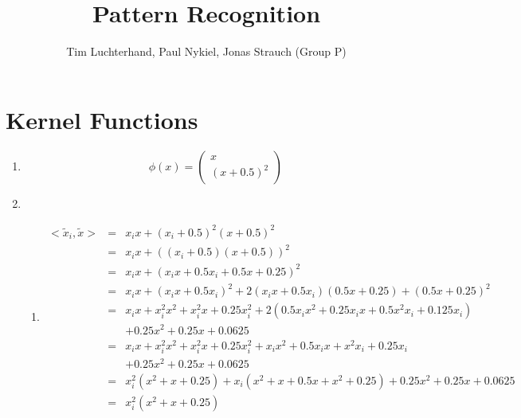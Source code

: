 \documentclass[DIN, pagenumber=false, fontsize=11pt, parskip=half]{scrartcl}
\title{Pattern Recognition}
\author{Tim Luchterhand, Paul Nykiel, Jonas Strauch (Group P)}
\begin{document}
    \maketitle
    \section{Kernel Functions}
    \begin{enumerate}
        \item 
            \begin{equation*}
                \phi(x) = \begin{pmatrix} x \\ {(x + 0.5)}^2 \end{pmatrix}
            \end{equation*}
            \setcounter{enumi}{3}
        \item
            \begin{enumerate}[label=\alph*)]
                \item
                    \begin{eqnarray*}
                        <\tilde{x}_i, \tilde{x}>
                            &=& x_i x + {(x_i + 0.5)}^2 {(x + 0.5)}^2 \\
                            &=& x_i x + {\left((x_i + 0.5) (x + 0.5)\right)}^2 \\
                            &=& x_i x + {(x_i x + 0.5 x_i + 0.5 x + 0.25)}^2 \\
                            &=& x_i x + {(x_i x + 0.5 x_i)}^2 
                                + 2 (x_i x + 0.5 x_i) (0.5 x + 0.25)
                                + {(0.5 x + 0.25)}^2 \\
                            &=& x_i x + x_i^2 x^2 + x_i^2 x + 0.25 x_i^2
                                + 2 (0.5 x_i x^2 + 0.25 x_i x + 0.5 x^2 x_i + 0.125 x_i) \\
                                && + 0.25 x^2 + 0.25 x + 0.0625 \\
                            &=& x_i x + x_i^2 x^2 + x_i^2 x + 0.25 x_i^2
                                + x_i x^2 + 0.5 x_i x + x^2 x_i + 0.25 x_i \\
                                && + 0.25 x^2 + 0.25 x + 0.0625 \\
                            &=& x_i^2 (x^2 + x + 0.25)
                                + x_i (x^2 + x + 0.5 x + x^2 + 0.25)
                                + 0.25 x^2 + 0.25 x + 0.0625 \\
                            &=& x_i^2 (x^2 + x + 0.25)

\end{eqnarray*}
\end{enumerate}
\end{enumerate}
\end{document}
